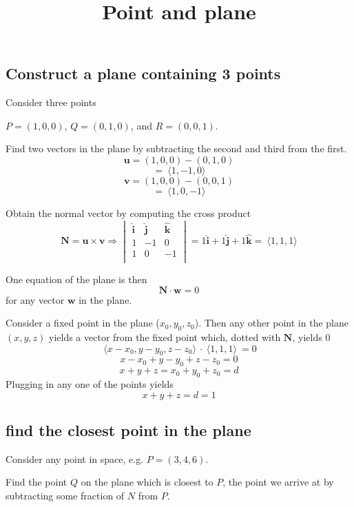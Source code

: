 \documentclass[11pt, oneside]{article}
\title{Point and plane}
\date{}
\begin{document}
\maketitle
\Large


\subsection*{Construct a plane containing 3 points}

Consider three points 

$P = (1,0,0)$, $Q = (0,1,0)$, and $R = (0,0,1)$.  

Find two vectors in the plane by subtracting the second and third from the first.
\[ \mathbf{u} = (1,0,0) - (0,1,0) \]
\[ =  \ \langle 1,-1,0 \rangle \]
\[ \mathbf{v} = (1,0,0) - (0,0,1) \]
\[ = \ \langle 1,0,-1 \rangle \]

Obtain the normal vector by computing the cross product
\[ \mathbf{N} = \mathbf{u} \times \mathbf{v} 
\Rightarrow 
\begin{vmatrix}
\mathbf{\hat{i}} & \mathbf{\hat{j}}  & \mathbf{\hat{k}}  \\
1 & -1 & 0 \\
1 & 0 & -1 \\ 
\end{vmatrix} 
= 1 \mathbf{\hat{i}}  + 1 \mathbf{\hat{j}}  + 1 \mathbf{\hat{k}}  = \ \langle 1,1,1 \rangle  \]

One equation of the plane is then
\[ \mathbf{N} \cdot \mathbf{w} = 0 \] 
for any vector $\mathbf{w}$ in the plane.

Consider a fixed point in the plane ($x_0,y_0,z_0$).  Then any other point in the plane $(x,y,z)$ yields a vector from the fixed point which, dotted with $\mathbf{N}$, yields $0$
\[ \ \langle x-x_0,y-y_0,z-z_0 \rangle \  \cdot \  \langle 1,1,1 \rangle \ = 0 \]
\[ x - x_0 + y - y_0 + z - z_0 = 0 \]
\[ x + y + z = x_0 + y_0 + z_0 = d \]
Plugging in any one of the points yields
\[ x + y + z = d = 1 \]

\subsection*{find the closest point in the plane}

Consider any point in space, e.g. $P = (3,4,6)$.  

Find the point $Q$ on the plane which is closest to $P$, the point we arrive at by subtracting some fraction of $N$ from $P$.  
\end{document}
